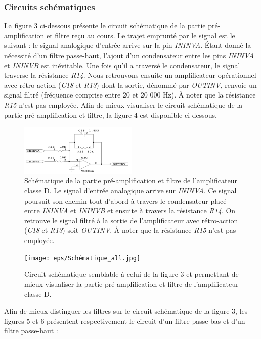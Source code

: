 \documentclass[10pt, oneside, a4paper]{article}
\begin{document}
\subsubsection{Circuits schématiques}
La figure 3 ci-dessous présente le circuit schématique de la partie pré-amplification et filtre reçu au cours. Le trajet emprunté par le signal est le suivant : le signal analogique d'entrée arrive sur la pin \textit{ININVA}. Étant donné la nécessité d'un filtre passe-haut, l'ajout d'un condensateur entre les pins \textit{ININVA} et \textit{ININVB} est inévitable. Une fois qu'il a traversé le condensateur, le signal traverse la résistance \textit{R14}. Nous retrouvons ensuite un amplificateur opérationnel avec rétro-action (\textit{C18} et \textit{R13}) dont la sortie, dénommé par \textit{OUTINV}, renvoie un signal filtré (fréquence comprise entre 20 et 20 000 Hz). À noter que la résistance \textit{R15} n'est pas employée.
Afin de mieux visualiser le circuit schématique de la partie pré-amplification et filtre, la figure 4 est disponible ci-dessous.

\begin{figure}
    \centering
    \includegraphics[width=0.5\textwidth]{eps/Schematique_All.jpg}
    \caption{Schématique de la partie pré-amplification et filtre de l'amplificateur classe D. 
    		 Le signal d'entrée analogique arrive sur \textit{ININVA}. Ce signal poursuit son chemin tout d'abord à travers le condensateur placé entre \textit{ININVA} et \textit{ININVB} et ensuite à travers la résistance \textit{R14}. On retrouve le signal filtré à la sortie de l'amplificateur avec rétro-action (\textit{C18} et \textit{R13}) soit \textit{OUTINV}. À noter que la résistance \textit{R15} n'est pas employée.}
\end{figure}

\begin{figure}
    \centering
    \texttt{[image: eps/Schématique\_all.jpg]}
    \caption{Circuit schématique semblable à celui de la figure 3 et permettant de mieux visualiser la partie pré-amplification et filtre de l'amplificateur classe D.}
\end{figure}

Afin de mieux distinguer les filtres sur le circuit schématique de la figure 3, les figures 5 et 6 présentent respectivement le circuit d'un filtre passe-bas et d'un filtre passe-haut : 
\end{document}
